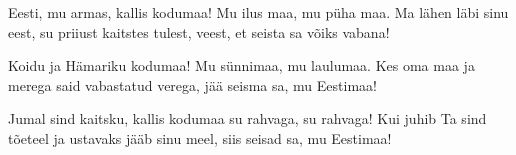 Eesti, mu armas, kallis kodumaa!
Mu ilus maa, mu p\"uha maa.
Ma l\"ahen l\"abi sinu eest,
su priiust kaitstes tulest, veest,
et seista sa v\~oiks vabana!

Koidu ja H\"amariku kodumaa!
Mu s\"unnimaa, mu laulumaa.
Kes oma maa ja merega
said vabastatud verega,
j\"a\"a seisma sa, mu Eestimaa!

Jumal sind kaitsku, kallis kodumaa
su rahvaga, su rahvaga!
Kui juhib Ta sind t\~oeteel
ja ustavaks j\"a\"ab sinu meel,
siis seisad sa, mu Eestimaa!